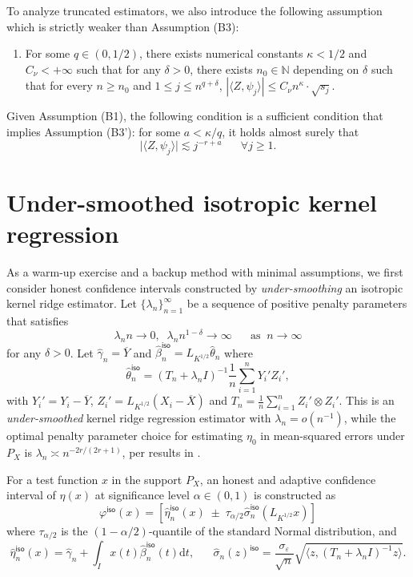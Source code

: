 \documentclass[11pt,a4paper]{article}
\renewcommand{\hat}{\widehat}
\renewcommand{\tilde}{\widetilde}
\renewcommand{\bar}{\overline}
\theoremstyle{definition}
\theoremstyle{plain}
\theoremstyle{remark}
\newcommand{\ud}{\mathrm d}
\newcommand{\iso}{\mathsf{iso}}
\begin{document}
To analyze truncated estimators, we also introduce the following assumption which is strictly weaker than Assumption (B3):
\begin{enumerate}
\item[(B3')] For some $q\in(0,1/2)$, there exists numerical constants $\kappa<1/2$ and $C_\nu<+\infty$ such that for any $\delta>0$, there exists $n_0\in\mathbb N$ depending on $\delta$ such that
for every $n\geq n_0$ and $1\leq j\leq n^{q+\delta}$, $|\langle Z,\psi_j\rangle|\leq C_\nu n^{\kappa}\cdot\sqrt{s_j}$.
\end{enumerate}

Given Assumption (B1), the following condition is a sufficient condition that implies Assumption (B3'): for some $a<\kappa/q$, it holds almost surely that
$$
\big|\langle Z,\psi_j\rangle\big|\lesssim j^{-r+a}\;\;\;\;\;\;\forall j\geq 1.
$$

\section{Under-smoothed isotropic kernel regression}\label{sec:isotropic}

As a warm-up exercise and a backup method with minimal assumptions, we first consider honest confidence intervals constructed by \emph{under-smoothing} an isotropic kernel ridge estimator.
Let $\{\lambda_n\}_{n=1}^{\infty}$ be a sequence of positive penalty parameters that satisfies
\begin{equation}
\lambda_n n \to 0,\;\; \lambda_n n^{1-\delta}\to \infty\;\;\;\;\;\;\text{as}\;\;n\to\infty
\label{eq:lambdan-1}
\end{equation}
for any $\delta>0$.
Let $\hat\gamma_n = \bar Y$ and $\hat\beta_n^\iso=L_{K^{1/2}}\hat\theta_n$ where 
$$
\hat\theta_n^\iso = (T_n+\lambda_n I)^{-1}\frac{1}{n}\sum_{i=1}^n Y_i'Z_i',
$$
with $Y_i'=Y_i-\bar Y$, $Z_i'=L_{K^{1/2}}(X_i-\bar X)$ and $T_n=\frac{1}{n}\sum_{i=1}^n Z_i'\otimes Z_i'$.
This is an \emph{under-smoothed} kernel ridge regression estimator with $\lambda_n=o(n^{-1})$, while the optimal penalty parameter choice for estimating $\eta_0$ in mean-squared errors under $P_X$
is $\lambda_n\asymp n^{-2r/(2r+1)}$, per results in \cite{cai2012minimax}.

For a test function $x$ in the support $P_X$, an honest and adaptive confidence interval of $\eta(x)$ at significance level $\alpha\in(0,1)$ is constructed as
$$
\varphi^\iso(x) = [\hat\eta_n^\iso(x)\;\pm\;\tau_{\alpha/2}\hat\sigma_n^\iso(L_{K^{1/2}}x)]
$$
where $\tau_{\alpha/2}$ is the $(1-\alpha/2)$-quantile of the standard Normal distribution, and
$$
\hat\eta_n^\iso(x) = \hat\gamma_n + \int_I x(t)\hat\beta_n^\iso(t)\ud t,\;\;\;\;\;\;\hat\sigma_n(z)^\iso = \frac{\sigma_\varepsilon}{\sqrt{n}}\sqrt{\langle z, (T_n+\lambda_n I)^{-1}z\rangle}.
$$
\end{document}
